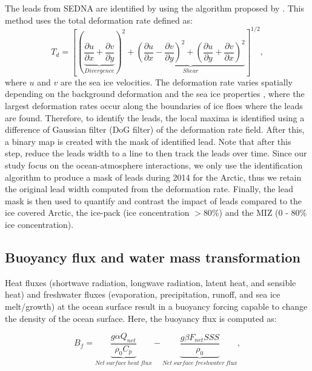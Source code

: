 \documentclass[lineno,sn-basic]{sn-jnl}%
\begin{document}
The leads from SEDNA are identified by using the algorithm proposed by \citet{Hutter_identification_2019}. This method uses the total deformation rate defined as: 
\begin{equation}
    T_d = \left[\left(\underbrace{\frac{\partial u}{\partial x} +\frac{\partial v}{\partial y}}_{Divergence}\right)^2 + \underbrace{\left(\frac{\partial u}{\partial x} - \frac{\partial v}{\partial y}\right)^2+ \left(\frac{\partial u}{\partial y} + \frac{\partial v}{\partial x}\right)^2}_{Shear}\right]^{1/2},
\end{equation}
where $u$ and $v$ are the sea ice velocities. The deformation rate varies spatially depending on the background deformation and the sea ice properties \citep{Reiser_LKF_2020}, where the largest deformation rates occur along the boundaries of ice floes where the leads are found. Therefore, to identify the leads, the local maxima is identified using a difference of Gaussian filter (DoG filter) of the deformation rate field. After this, a binary map is created with the mask of identified lead. Note that after this step, \citet{Hutter_identification_2019} reduce the leads width to a line to then track the leads over time. Since our study focus on the ocean-atmosphere interactions, we only use the identification algorithm to produce a mask of leads during 2014 for the Arctic, thus we retain the original lead width computed from the deformation rate. Finally, the lead mask is then used to quantify and contrast the impact of leads compared to the ice covered Arctic, the ice-pack (ice concentration $> 80\%$) and the MIZ (0 - 80\% ice concentration).

\subsection*{Buoyancy flux and water mass transformation}
 
Heat fluxes (shortwave radiation, longwave radiation, latent heat, and sensible heat) and freshwater fluxes (evaporation, precipitation, runoff, and sea ice melt/growth) at the ocean surface result in a buoyancy forcing capable to change the density of the ocean surface. Here, the buoyancy flux is computed as:

\begin{equation}
    B_f = \underbrace{\frac{g \alpha Q_{net}}{\rho_0 C_p}}_{Net\ surface\ heat\ flux} - \underbrace{\frac{g \beta F_{net} SSS }{\rho_0}}_{Net\ surface\ freshwater\ flux},
\end{equation}
\end{document}
